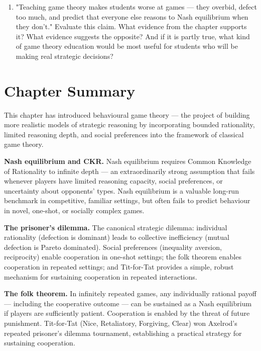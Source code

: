 \documentclass[12pt, letterpaper]{article}
\begin{document}
\begin{enumerate}
\item "Teaching game theory makes students worse at games --- they overbid, defect too much, and predict that everyone else reasons to Nash equilibrium when they don't." Evaluate this claim. What evidence from the chapter supports it? What evidence suggests the opposite? And if it is partly true, what kind of game theory education would be most useful for students who will be making real strategic decisions?
\end{enumerate}

\medskip


\section*{Chapter Summary}


This chapter has introduced behavioural game theory --- the project of building more realistic models of strategic reasoning by incorporating bounded rationality, limited reasoning depth, and social preferences into the framework of classical game theory.

\textbf{Nash equilibrium and CKR.} Nash equilibrium requires Common Knowledge of Rationality to infinite depth --- an extraordinarily strong assumption that fails whenever players have limited reasoning capacity, social preferences, or uncertainty about opponents' types. Nash equilibrium is a valuable long-run benchmark in competitive, familiar settings, but often fails to predict behaviour in novel, one-shot, or socially complex games.

\textbf{The prisoner's dilemma.} The canonical strategic dilemma: individual rationality (defection is dominant) leads to collective inefficiency (mutual defection is Pareto dominated). Social preferences (inequality aversion, reciprocity) enable cooperation in one-shot settings; the folk theorem enables cooperation in repeated settings; and Tit-for-Tat provides a simple, robust mechanism for sustaining cooperation in repeated interactions.

\textbf{The folk theorem.} In infinitely repeated games, any individually rational payoff --- including the cooperative outcome --- can be sustained as a Nash equilibrium if players are sufficiently patient. Cooperation is enabled by the threat of future punishment. Tit-for-Tat (Nice, Retaliatory, Forgiving, Clear) won Axelrod's repeated prisoner's dilemma tournament, establishing a practical strategy for sustaining cooperation.
\end{document}
